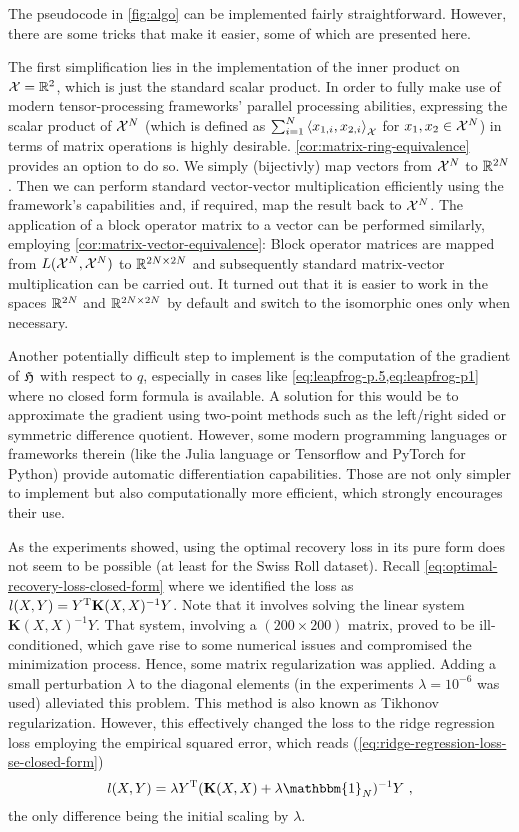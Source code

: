 The pseudocode in \cref{fig:algo} can be implemented fairly straightforward.
However, there are some tricks that make it easier, some of which are presented here.

The first simplification lies in the implementation of the inner product on $\mathcal{X} = \mathbb{R}^2$, which is just the standard scalar product.
In order to fully make use of modern tensor-processing frameworks' parallel processing abilities, expressing the scalar product of $\mathcal{X}^N$ (which is defined as $\sum_{i=1}^N \left<x_{1, i}, x_{2, i}\right>_{\mathcal{X}}$ for $x_1, x_2 \in \mathcal{X}^N$) in terms of matrix operations is highly desirable.
\cref{cor:matrix-ring-equivalence} provides an option to do so.
We simply (bijectivly) map vectors from $\mathcal{X}^N$ to $\mathbb{R}^{2N}$.
Then we can perform standard vector-vector multiplication efficiently using the framework's capabilities and, if required, map the result back to $\mathcal{X}^N$.
The application of a block operator matrix to a vector can be performed similarly, employing \cref{cor:matrix-vector-equivalence}:
Block operator matrices are mapped from $L(\mathcal{X}^N, \mathcal{X}^N)$ to $\mathbb{R}^{2N \times 2N}$ and subsequently standard matrix-vector multiplication can be carried out.
It turned out that it is easier to work in the spaces $\mathbb{R}^{2N}$ and $\mathbb{R}^{2N \times 2N}$ by default and switch to the isomorphic ones only when necessary.

Another potentially difficult step to implement is the computation of the gradient of $\mathfrak{H}$ with respect to $q$, especially in cases like \cref{eq:leapfrog-p.5,eq:leapfrog-p1} where no closed form formula is available.
A solution for this would be to approximate the gradient using two-point methods such as the left/right sided or symmetric difference quotient.
However, some modern programming languages or frameworks therein (like the Julia language or Tensorflow and PyTorch for Python) provide automatic differentiation capabilities.
Those are not only simpler to implement but also computationally more efficient, which strongly encourages their use.

As the experiments showed, using the optimal recovery loss in its pure form does not seem to be possible (at least for the Swiss Roll dataset).
Recall \cref{eq:optimal-recovery-loss-closed-form} where we identified the loss as $l(X, Y) = Y^{\mathrm{T}} \mathbf{K}(X, X)^{-1} Y$.
Note that it involves solving the linear system $\mathbf{K}(X, X)^{-1} Y$.
That system, involving a $(200\times200)$ matrix, proved to be ill-conditioned, which gave rise to some numerical issues and compromised the minimization process.
Hence, some matrix regularization was applied.
Adding a small perturbation $\lambda$ to the diagonal elements (in the experiments $\lambda = 10^{-6}$ was used) alleviated this problem.
This method is also known as Tikhonov regularization.
However, this effectively changed the loss to the ridge regression loss employing the empirical squared error, which reads (\cref{eq:ridge-regression-loss-se-closed-form})
\begin{equation}
	l(X, Y) = \lambda Y^\T (\mathbf{K}(X, X) + \lambda \mathbbm{1}_N)^{-1} Y \ ,
\end{equation}
the only difference being the initial scaling by $\lambda$.

